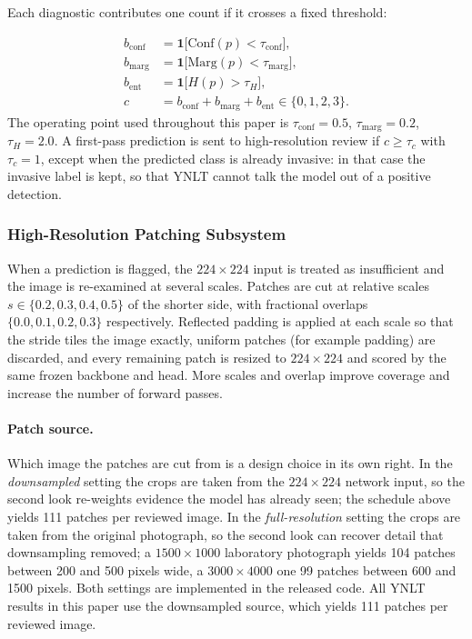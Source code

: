 \documentclass[final,3p,times,twocolumn]{elsarticle}
\begin{document}
Each diagnostic contributes one count if it crosses a fixed threshold:

\[
\begin{aligned}
b_{\mathrm{conf}} &= \mathbf{1}\bigl[\mathrm{Conf}(p) < \tau_{\mathrm{conf}}\bigr], \\
b_{\mathrm{marg}} &= \mathbf{1}\bigl[\mathrm{Marg}(p) < \tau_{\mathrm{marg}}\bigr], \\
b_{\mathrm{ent}}  &= \mathbf{1}\bigl[H(p) > \tau_{H}\bigr], \\
c &= b_{\mathrm{conf}} + b_{\mathrm{marg}} + b_{\mathrm{ent}} \in \{0,1,2,3\}.
\end{aligned}
\]
The operating point used throughout this paper is \(\tau_{\mathrm{conf}}=0.5\), \(\tau_{\mathrm{marg}}=0.2\), \(\tau_{H}=2.0\). A first-pass prediction is sent to high-resolution review if \(c \ge \tau_{c}\) with \(\tau_{c}=1\), except when the predicted class is already invasive: in that case the invasive label is kept, so that YNLT cannot talk the model out of a positive detection.

\subsubsection{High-Resolution Patching Subsystem}
\label{subsec:patching}

When a prediction is flagged, the $224\times 224$ input is treated as insufficient and the image is re-examined at several scales. Patches are cut at relative scales \(s \in \{0.2, 0.3, 0.4, 0.5\}\) of the shorter side, with fractional overlaps \(\{0.0, 0.1, 0.2, 0.3\}\) respectively. Reflected padding is applied at each scale so that the stride tiles the image exactly, uniform patches (for example padding) are discarded, and every remaining patch is resized to $224\times 224$ and scored by the same frozen backbone and head. More scales and overlap improve coverage and increase the number of forward passes.

\paragraph{Patch source.} Which image the patches are cut from is a design choice in its own right. In the \emph{downsampled} setting the crops are taken from the $224\times 224$ network input, so the second look re-weights evidence the model has already seen; the schedule above yields 111 patches per reviewed image. In the \emph{full-resolution} setting the crops are taken from the original photograph, so the second look can recover detail that downsampling removed; a $1500\times 1000$ laboratory photograph yields 104 patches between 200 and 500 pixels wide, a $3000\times 4000$ one 99 patches between 600 and 1500 pixels. Both settings are implemented in the released code. All YNLT results in this paper use the downsampled source, which yields 111 patches per reviewed image.
\end{document}
